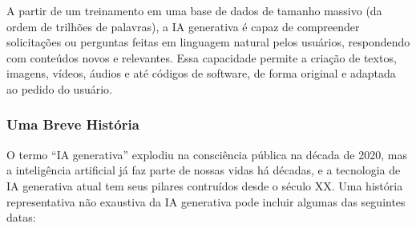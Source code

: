 \documentclass[a4paper, 12pt]{article}
\begin{document}
    A partir de um treinamento em uma base de dados de tamanho massivo (da ordem de trilhões de palavras), a IA generativa é capaz de compreender solicitações ou perguntas feitas em linguagem natural pelos usuários, respondendo com conteúdos novos e relevantes. Essa capacidade permite a criação de textos, imagens, vídeos, áudios e até códigos de software, de forma original e adaptada ao pedido do usuário.

    \subsubsection{Uma Breve História}

    O termo ``IA generativa'' explodiu na consciência pública na década de 2020, mas a inteligência artificial já faz parte de nossas vidas há décadas, e a tecnologia de IA generativa atual tem seus pilares contruídos desde o século XX. Uma história representativa não exaustiva da IA generativa pode incluir algumas das seguintes datas:
\end{document}
